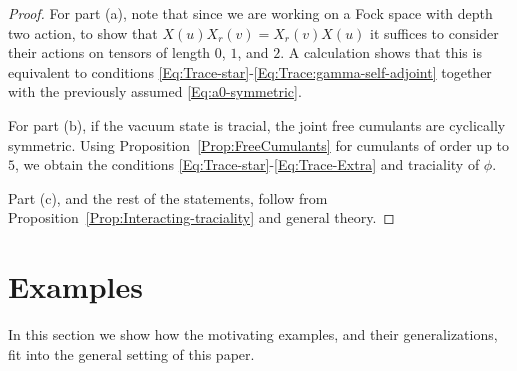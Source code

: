 \documentclass[12pt]{amsart}
\theoremstyle{definition}
\begin{document}
\begin{proof}
For part (a), note that since we are working on a Fock space with depth two action, to show that $X(u) X_r(v) = X_r(v) X(u)$ it suffices to consider their actions on tensors of length $0$, $1$, and $2$. A calculation shows that this is equivalent to conditions \eqref{Eq:Trace-star}-\eqref{Eq:Trace:gamma-self-adjoint} together with the previously assumed \eqref{Eq:a0-symmetric}.

For part (b), if the vacuum state is tracial, the joint free cumulants are cyclically symmetric. Using Proposition~\ref{Prop:FreeCumulants} for cumulants of order up to $5$, we obtain the conditions \eqref{Eq:Trace-star}-\eqref{Eq:Trace-Extra} and traciality of $\phi$.

Part (c), and the rest of the statements, follow from Proposition~\ref{Prop:Interacting-traciality} and general theory.
\end{proof}


\section{Examples}
\label{Sec:Examples}

In this section we show how the motivating examples, and their generalizations, fit into the general setting of this paper.
\end{document}
